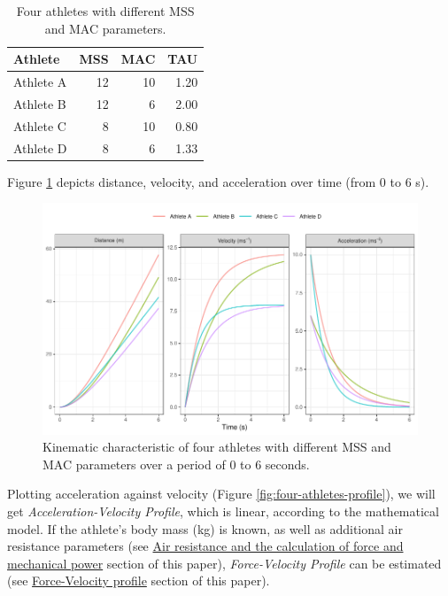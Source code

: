 \documentclass[fleqn,10pt,lineno]{wlpeerj} %
\begin{document}
\begin{table}

\caption{\label{tab:four-athletes-table}Four athletes with different MSS and MAC parameters.}
\centering
\begin{tabular}[t]{lrrr}
\toprule
Athlete & MSS & MAC & TAU\\
\midrule
Athlete A & 12 & 10 & 1.20\\
Athlete B & 12 & 6 & 2.00\\
Athlete C & 8 & 10 & 0.80\\
Athlete D & 8 & 6 & 1.33\\
\bottomrule
\end{tabular}
\end{table}

Figure \ref{fig:four-athletes-kinematics} depicts distance, velocity, and acceleration over time (from 0 to 6 s).

\begin{figure}

{\centering \includegraphics[width=1\linewidth]{paper_files/figure-latex/four-athletes-kinematics-1} 

}

\caption{Kinematic characteristic of four athletes with different MSS and MAC parameters over a period of 0 to 6 seconds.}\label{fig:four-athletes-kinematics}
\end{figure}

Plotting acceleration against velocity (Figure \ref{fig:four-athletes-profile}), we will get \emph{Acceleration-Velocity Profile}, which is linear, according to the mathematical model. If the athlete's body mass (kg) is known, as well as additional air resistance parameters (see \protect\hyperlink{air-resistance-and-the-calculation-of-force-and-mechanical-power}{Air resistance and the calculation of force and mechanical power} section of this paper), \emph{Force-Velocity Profile} can be estimated (see \protect\hyperlink{force-velocity-profile}{Force-Velocity profile} section of this paper).
\end{document}
